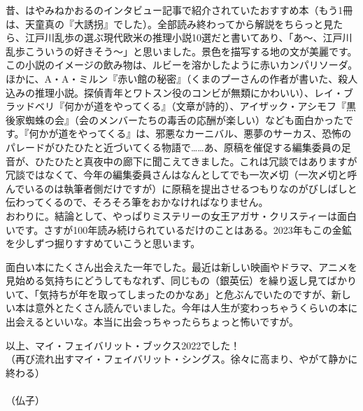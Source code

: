 昔、はやみねかおるのインタビュー記事で紹介されていたおすすめ本（もう1冊は、天童真の『大誘拐』でした）。全部読み終わってから解説をちらっと見たら、江戸川乱歩の選ぶ現代欧米の推理小説10選だと書いてあり、「あ〜、江戸川乱歩こういうの好きそう〜」と思いました。景色を描写する地の文が美麗です。この小説のイメージの飲み物は、ルビーを溶かしたように赤いカンパリソーダ。
\\

ほかに、A・A・ミルン『赤い館の秘密』（くまのプーさんの作者が書いた、殺人込みの推理小説。探偵青年とワトスン役のコンビが無類にかわいい）、レイ・ブラッドベリ『何かが道をやってくる』（文章が詩的）、アイザック・アシモフ『黒後家蜘蛛の会』（会のメンバーたちの毒舌の応酬が楽しい）なども面白かったです。『何かが道をやってくる』は、邪悪なカーニバル、悪夢のサーカス、恐怖のパレードがひたひたと近づいてくる物語で……あ、原稿を催促する編集委員の足音が、ひたひたと真夜中の廊下に聞こえてきました。これは冗談ではありますが冗談ではなくて、今年の編集委員さんはなんとしてでも一次〆切（一次〆切と呼んでいるのは執筆者側だけですが）に原稿を提出させるつもりなのがびしばしと伝わってくるので、そろそろ筆をおかなければなりません。
\\

おわりに。結論として、やっぱりミステリーの女王アガサ・クリスティーは面白いです。さすが100年読み続けられているだけのことはある。2023年もこの金鉱を少しずつ掘りすすめていこうと思います。

面白い本にたくさん出会えた一年でした。最近は新しい映画やドラマ、アニメを見始める気持ちにどうしてもなれず、同じもの（銀英伝）を繰り返し見てばかりいて、「気持ちが年を取ってしまったのかなあ」と危ぶんでいたのですが、新しい本は意外とたくさん読んでいました。今年は人生が変わっちゃうくらいの本に出会えるといいな。本当に出会っちゃったらちょっと怖いですが。

以上、マイ・フェイバリット・ブックス2022でした！
\\
（再び流れ出すマイ・フェイバリット・シングス。徐々に高まり、やがて静かに終わる）
\\
\\
（仏子）
